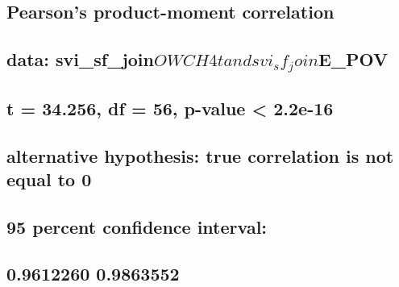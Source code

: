 \documentclass[
  12pt,
]{article}
\begin{document}
\begin{verbatim}
\end{verbatim}

\hypertarget{section-80}{%
\subsection{}\label{section-80}}

\hypertarget{pearsons-product-moment-correlation-8}{%
\subsection{Pearson's product-moment
correlation}\label{pearsons-product-moment-correlation-8}}

\hypertarget{section-81}{%
\subsection{}\label{section-81}}

\hypertarget{data-svi_sf_joinowch4t-and-svi_sf_joine_pov}{%
\subsection{\texorpdfstring{data:
svi\_sf\_join\(OWCH4t and svi_sf_join\)E\_POV}{data: svi\_sf\_joinOWCH4t and svi\_sf\_joinE\_POV}}\label{data-svi_sf_joinowch4t-and-svi_sf_joine_pov}}

\hypertarget{t-34.256-df-56-p-value-2.2e-16}{%
\subsection{t = 34.256, df = 56, p-value \textless{}
2.2e-16}\label{t-34.256-df-56-p-value-2.2e-16}}

\hypertarget{alternative-hypothesis-true-correlation-is-not-equal-to-0-8}{%
\subsection{alternative hypothesis: true correlation is not equal to
0}\label{alternative-hypothesis-true-correlation-is-not-equal-to-0-8}}

\hypertarget{percent-confidence-interval-8}{%
\subsection{95 percent confidence
interval:}\label{percent-confidence-interval-8}}

\hypertarget{section-82}{%
\subsection{0.9612260 0.9863552}\label{section-82}}
\end{document}
